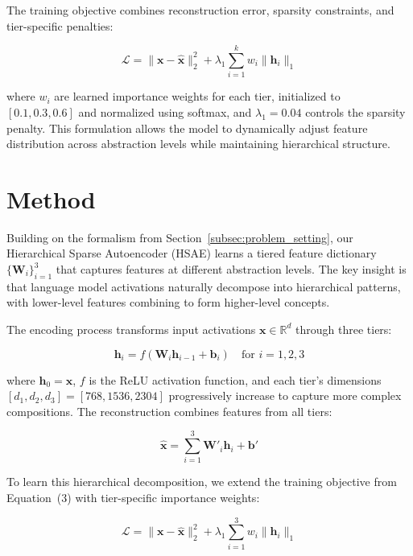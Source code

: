 \documentclass{article} %
\begin{document}
The training objective combines reconstruction error, sparsity constraints, and tier-specific penalties:

\begin{equation}
    \mathcal{L} = \|\mathbf{x} - \hat{\mathbf{x}}\|_2^2 + \lambda_1\sum_{i=1}^k w_i\|\mathbf{h}_i\|_1
\end{equation}

where $w_i$ are learned importance weights for each tier, initialized to $[0.1, 0.3, 0.6]$ and normalized using softmax, and $\lambda_1 = 0.04$ controls the sparsity penalty. This formulation allows the model to dynamically adjust feature distribution across abstraction levels while maintaining hierarchical structure.

\section{Method}
\label{sec:method}

Building on the formalism from Section~\ref{subsec:problem_setting}, our Hierarchical Sparse Autoencoder (HSAE) learns a tiered feature dictionary $\{\mathbf{W}_i\}_{i=1}^3$ that captures features at different abstraction levels. The key insight is that language model activations naturally decompose into hierarchical patterns, with lower-level features combining to form higher-level concepts.

The encoding process transforms input activations $\mathbf{x} \in \mathbb{R}^d$ through three tiers:

\begin{equation}
    \mathbf{h}_i = f(\mathbf{W}_i\mathbf{h}_{i-1} + \mathbf{b}_i) \quad \text{for } i=1,2,3
\end{equation}

where $\mathbf{h}_0 = \mathbf{x}$, $f$ is the ReLU activation function, and each tier's dimensions $[d_1, d_2, d_3] = [768, 1536, 2304]$ progressively increase to capture more complex compositions. The reconstruction combines features from all tiers:

\begin{equation}
    \hat{\mathbf{x}} = \sum_{i=1}^3 \mathbf{W}'_i\mathbf{h}_i + \mathbf{b}'
\end{equation}

To learn this hierarchical decomposition, we extend the training objective from Equation~(3) with tier-specific importance weights:

\begin{equation}
    \mathcal{L} = \|\mathbf{x} - \hat{\mathbf{x}}\|_2^2 + \lambda_1\sum_{i=1}^3 w_i\|\mathbf{h}_i\|_1
\end{equation}
\end{document}
